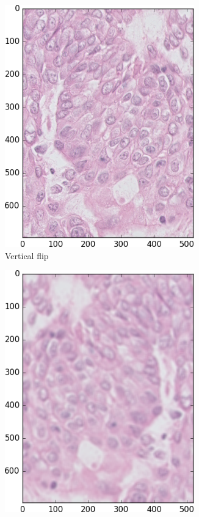 \documentclass[a4paper,10pt]{article}
\begin{document}
\begin{figure}
\begin{multicols}{3}
    \begin{subfigure}{0.3\textwidth}
    \includegraphics[width=0.9\textwidth]{flip.png}\par 
     \caption{Vertical flip}
     \label{fig:flip}
	\end{subfigure}%
	\begin{subfigure}{0.3\textwidth}
    \includegraphics[width=0.9\textwidth]{blur.png}\par 

\end{subfigure}
\end{multicols}
\end{figure}
\end{document}
